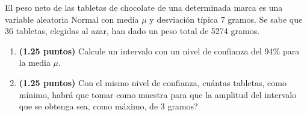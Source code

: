 
El peso neto de las tabletas de chocolate de una determinada marca es una variable aleatoria Normal con media $\mu$ y desviación típica 7 gramos. Se sabe que 36 tabletas, elegidas al azar, han dado un peso total de 5274 gramos.
\begin{enumerate}[label=\alph*)]
\item \textbf{(1.25 puntos)} Calcule un intervalo con un nivel de confianza del 94\% para la media $\mu$.
\item \textbf{(1.25 puntos)} Con el mismo nivel de confianza, \textquestiondown{}cuántas tabletas, como mínimo, habrá que tomar como muestra para que la amplitud del intervalo que se obtenga sea, como máximo, de 3 gramos?
\end{enumerate}

